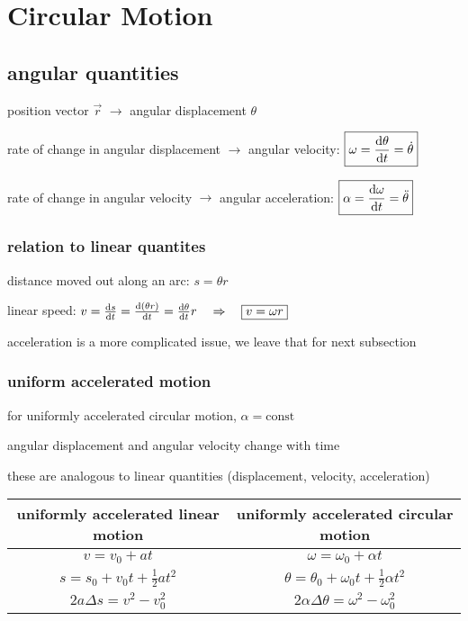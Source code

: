 \section{Circular Motion}

\subsection{angular quantities}

position vector $\vec{r}$ $\longrightarrow$ angular displacement $\theta$

rate of change in angular displacement $\longrightarrow$ angular velocity: $\boxed{\omega = \frac{\mathrm{d}\theta}{\mathrm{d}t} = \dot{\theta}}$

rate of change in angular velocity $\longrightarrow$ angular acceleration: $\boxed{\alpha = \frac{\mathrm{d}\omega}{\mathrm{d}t} = \ddot{\theta}}$

\subsubsection*{relation to linear quantites}

distance moved out along an arc: $s=\theta r$

linear speed: $v=\frac{\mathrm{d}s}{\mathrm{d}t} = \frac{\mathrm{d}(\theta r)}{\mathrm{d}t} = \frac{\mathrm{d}\theta}{\mathrm{d}t} r \quad \Rightarrow \quad \boxed{v=\omega r}$

acceleration is a more complicated issue, we leave that for next subsection

\subsubsection*{uniform accelerated motion}

for uniformly accelerated circular motion, $\alpha = \text{const}$

angular displacement and angular velocity change with time

these are analogous to linear quantities (displacement, velocity, acceleration)

\begin{center}
	\begin{tabular}{|c|c|}
		\hline
		 uniformly accelerated linear motion & uniformly accelerated circular motion \\
		 \hline
		 $v = v_0 + a t$ & $\omega = \omega_0 + \alpha t$\\
		 $s = s_0 + v_0 t + \frac{1}{2}at^2$ & $\theta = \theta_0 + \omega_0 t + \frac{1}{2}\alpha t^2$ \\
		 $2a\Delta s = v^2 - v_0^2$	 &  $2\alpha \Delta \theta = \omega ^2 - \omega_0^2$ \\
		 \hline
	\end{tabular}
\end{center}

